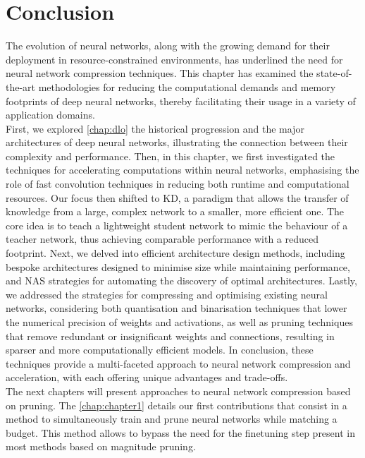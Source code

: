 \section{Conclusion}


The evolution of neural networks, along with the growing demand for their
deployment in resource-constrained environments, has underlined the need for
neural network compression techniques. This chapter has examined the
state-of-the-art methodologies for reducing the computational demands and memory
footprints of deep neural networks, thereby facilitating their usage in a
variety of application domains.\\

First, we explored \cref{chap:dlo} the historical progression and the major
architectures of deep neural networks, illustrating the connection between their
complexity and performance. Then, in this chapter, we first investigated the
techniques for accelerating computations within neural networks, emphasising the
role of fast convolution techniques in reducing both runtime and computational
resources. Our focus then shifted to \acl{KD}, a paradigm that allows the
transfer of knowledge from a large, complex network to a smaller, more efficient
one. The core idea is to teach a lightweight student network to mimic the
behaviour of a teacher network, thus achieving comparable performance with a
reduced footprint. Next, we delved into efficient architecture design methods,
including bespoke architectures designed to minimise size while maintaining
performance, and \acl{NAS} strategies for automating the discovery of optimal
architectures. Lastly, we addressed the strategies for compressing and
optimising existing neural networks, considering both quantisation and
binarisation techniques that lower the numerical precision of weights and
activations, as well as pruning techniques that remove redundant or
insignificant weights and connections, resulting in sparser and more
computationally efficient models. In conclusion, these techniques provide a
multi-faceted approach to neural network compression and acceleration, with each
offering unique advantages and trade-offs.\\

The next chapters will present approaches to neural network compression based on
pruning. The \cref{chap:chapter1} details our first contributions that consist
in a method to simultaneously train and prune neural networks while matching a
budget. This method allows to bypass the need for the finetuning step present in
most methods based on magnitude pruning.